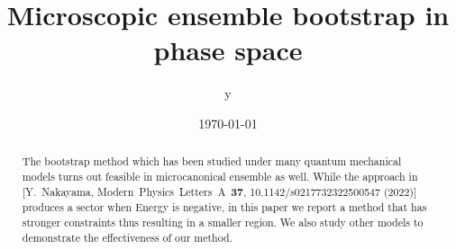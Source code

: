 \documentclass[aps, preprint,amsmath, amssymb]{revtex4-2}
\begin{document}

\title{Microscopic ensemble bootstrap in phase space}


\author{y}


\date{\today}

\begin{abstract}
    The bootstrap method which has been studied under many quantum mechanical models turns out feasible in microcanonical ensemble as well. While the approach in [Y.\ Nakayama, Modern\ Physics\ Letters\ A\ \textbf{37}, 10.1142/s0217732322500547 (2022)] produces a sector when Energy is negative, in this paper we report a method that has stronger constraints thus resulting in a smaller region. We also study other models to demonstrate the effectiveness of our method.
\end{abstract}

\end{document}
